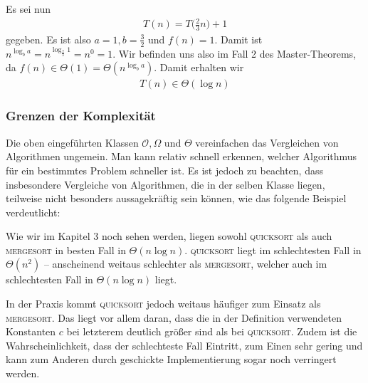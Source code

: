 \begin{bsp}
	Es sei nun
	\begin{gather*}
		T(n) = T\big(\frac{2}{3} n \big) + 1
	\end{gather*}
	gegeben. Es ist also $a = 1, b = \frac{3}{2}$ und $f(n) = 1$. Damit ist $n^{\log_b a} = n^{\log_{\frac{2}{3}} 1} = n^0 = 1$. Wir befinden uns also im Fall 2 des Master-Theorems, da $f(n) \in \Theta(1) = \Theta(n^{\log_b a})$. Damit erhalten wir
	\begin{gather*}
		T(n) \in \Theta(\log n)
	\end{gather*}
\end{bsp}

\subsubsection{Grenzen der Komplexität}
Die oben eingeführten Klassen $\mathcal{O}, \Omega$ und $\Theta$ vereinfachen das Vergleichen von Algorithmen ungemein. Man kann relativ schnell erkennen, welcher Algorithmus für ein bestimmtes Problem schneller ist.
Es ist jedoch zu beachten, dass insbesondere Vergleiche von Algorithmen, die in der selben Klasse liegen, teilweise nicht besonders aussagekräftig sein können, wie das folgende Beispiel verdeutlicht:

Wie wir im Kapitel 3 noch sehen werden, liegen sowohl \textsc{quicksort} als auch \textsc{mergesort} in besten Fall in $\Theta(n \log n)$. \textsc{quicksort} liegt im schlechtesten Fall in $\Theta(n^2)$ -- anscheinend weitaus schlechter als \textsc{mergesort}, welcher auch im schlechtesten Fall in $\Theta(n \log n)$ liegt.

In der Praxis kommt \textsc{quicksort} jedoch weitaus häufiger zum Einsatz als \textsc{mergesort}. Das liegt vor allem daran, dass die in der Definition verwendeten Konstanten $c$ bei letzterem deutlich größer sind als bei \textsc{quicksort}. Zudem ist die Wahrscheinlichkeit, dass der schlechteste Fall Eintritt, zum Einen sehr gering und kann zum Anderen durch geschickte Implementierung sogar noch verringert werden.